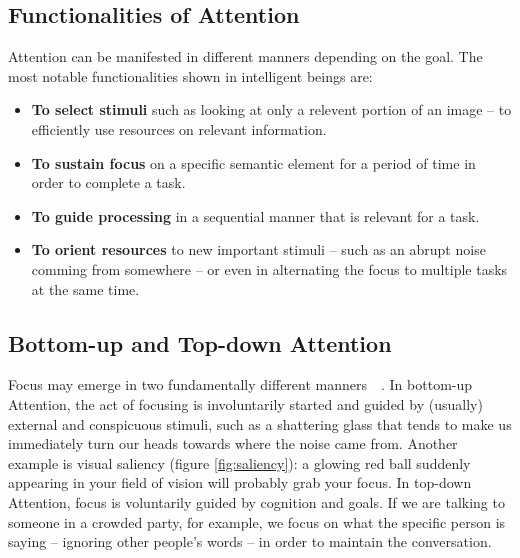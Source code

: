 \documentclass[English]{style/ic-tese-v3}
\begin{document}
\subsection{Functionalities of Attention}
Attention can be manifested in different manners depending on the goal.
The most notable functionalities shown in intelligent beings are:
\begin{itemize}
    \item \textbf{To select stimuli} such as looking at only a relevent portion of an image --
        to efficiently use resources on relevant information.
    \item \textbf{To sustain focus} on a specific semantic element for a period of time in order to complete
        a task.
    \item \textbf{To guide processing} in a sequential manner that is relevant for a task.
    \item \textbf{To orient resources} to new important stimuli
        -- such as an abrupt noise comming from somewhere --
        or even in alternating the focus to multiple tasks at the same time.
\end{itemize}

\subsection{Bottom-up and Top-down Attention}
Focus may emerge in two fundamentally different manners~\cite{ref:esther-thesis}~\cite{ref:vocus}.
In bottom-up Attention, the act of focusing is involuntarily
started and guided by (usually) external and conspicuous stimuli,
such as a shattering glass that tends to
make us immediately turn our heads towards where the noise came from.
Another example is visual saliency (figure \ref{fig:saliency}):
a glowing red ball suddenly appearing in
your field of vision will probably grab your focus.
In top-down Attention, focus is voluntarily guided by cognition and goals.
If we are talking to someone in a crowded party, for example,
we focus on what the specific person is saying
-- ignoring other people's words -- in order to maintain the conversation.
\end{document}
